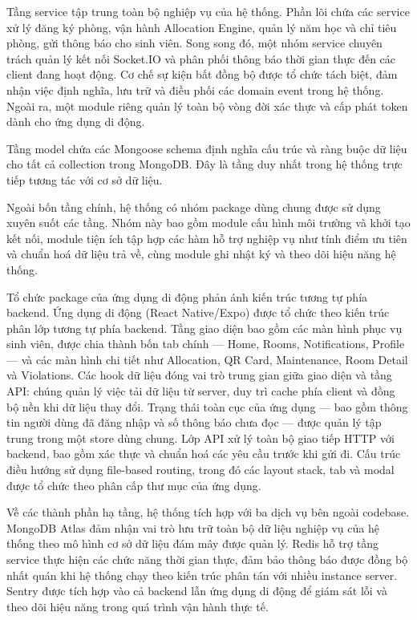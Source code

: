 ﻿\documentclass[a4paper,12pt,openany,oneside]{report}
\begin{document}
Tầng service tập trung toàn bộ nghiệp vụ của hệ thống. Phần lõi chứa các
service xử lý đăng ký phòng, vận hành Allocation Engine, quản lý năm học và
chỉ tiêu phòng, gửi thông báo cho sinh viên. Song song đó, một nhóm service
chuyên trách quản lý kết nối Socket.IO và phân phối thông báo thời gian thực
đến các client đang hoạt động. Cơ chế sự kiện bất đồng bộ được tổ chức tách
biệt, đảm nhận việc định nghĩa, lưu trữ và điều phối các domain event trong
hệ thống. Ngoài ra, một module riêng quản lý toàn bộ vòng đời xác thực và
cấp phát token dành cho ứng dụng di động.

Tầng model chứa các Mongoose schema định nghĩa cấu trúc và ràng buộc dữ liệu
cho tất cả collection trong MongoDB. Đây là tầng duy nhất trong hệ thống trực
tiếp tương tác với cơ sở dữ liệu.

Ngoài bốn tầng chính, hệ thống có nhóm package dùng chung được sử dụng xuyên
suốt các tầng. Nhóm này bao gồm module cấu hình môi trường và khởi tạo kết
nối, module tiện ích tập hợp các hàm hỗ trợ nghiệp vụ như tính điểm ưu tiên
và chuẩn hoá dữ liệu trả về, cùng module ghi nhật ký và theo dõi hiệu năng
hệ thống.

Tổ chức package của ứng dụng di động phản ánh kiến trúc tương tự phía backend.
Ứng dụng di động (React Native/Expo) được tổ chức theo kiến trúc phân lớp
tương tự phía backend. Tầng giao diện bao gồm các màn hình phục vụ sinh viên,
được chia thành bốn tab chính --- Home, Rooms, Notifications, Profile --- và
các màn hình chi tiết như Allocation, QR Card, Maintenance, Room Detail và
Violations. Các hook dữ liệu đóng vai trò trung gian giữa giao diện và tầng
API: chúng quản lý việc tải dữ liệu từ server, duy trì cache phía client và
đồng bộ nền khi dữ liệu thay đổi. Trạng thái toàn cục của ứng dụng --- bao
gồm thông tin người dùng đã đăng nhập và số thông báo chưa đọc --- được quản
lý tập trung trong một store dùng chung. Lớp API xử lý toàn bộ giao tiếp
HTTP với backend, bao gồm xác thực và chuẩn hoá các yêu cầu trước khi gửi đi.
Cấu trúc điều hướng sử dụng file-based routing, trong đó các layout stack,
tab và modal được tổ chức theo phân cấp thư mục của ứng dụng.

Về các thành phần hạ tầng, hệ thống tích hợp với ba dịch vụ bên ngoài codebase. MongoDB Atlas
đảm nhận vai trò lưu trữ toàn bộ dữ liệu nghiệp vụ của hệ thống theo mô hình
cơ sở dữ liệu đám mây được quản lý. Redis hỗ trợ tầng service thực hiện các
chức năng thời gian thực, đảm bảo thông báo được đồng bộ nhất quán khi hệ
thống chạy theo kiến trúc phân tán với nhiều instance server. Sentry được tích
hợp vào cả backend lẫn ứng dụng di động để giám sát lỗi và theo dõi hiệu
năng trong quá trình vận hành thực tế.
\end{document}
